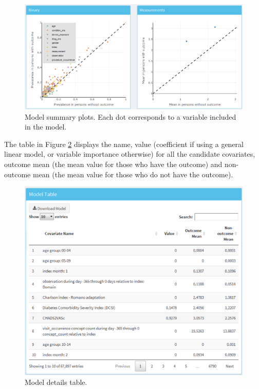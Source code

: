 \documentclass[11pt]{book}
\theoremstyle{definition}
\theoremstyle{definition}
\theoremstyle{definition}
\theoremstyle{remark}
\begin{document}
\begin{figure}

{\centering \includegraphics[width=1\linewidth]{images/PatientLevelPrediction/shiny/shinyModelPlots} 

}

\caption{Model summary plots. Each dot corresponds to a variable included in the model.}\label{fig:shinyModelPlots}
\end{figure}

The table in Figure \ref{fig:shinyModelTable} displays the name, value (coefficient if using a general linear model, or variable importance otherwise) for all the candidate covariates, outcome mean (the mean value for those who have the outcome) and non-outcome mean (the mean value for those who do not have the outcome).

\begin{figure}

{\centering \includegraphics[width=1\linewidth]{images/PatientLevelPrediction/shiny/shinyModelTable} 

}

\caption{Model details table.}\label{fig:shinyModelTable}
\end{figure}
\end{document}
